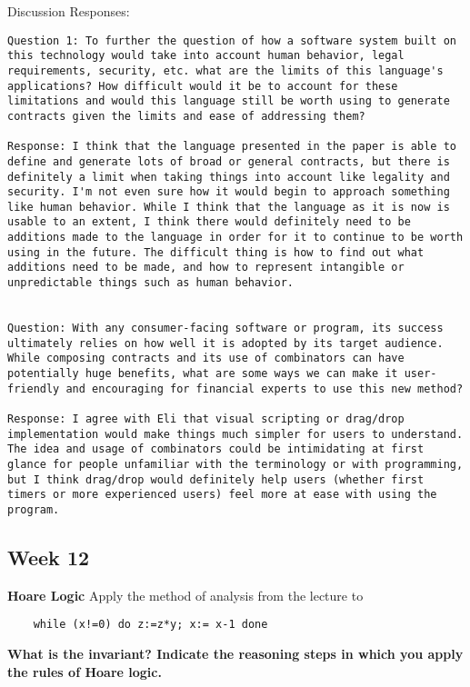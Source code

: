 \documentclass{article}
\theoremstyle{theorem}
\theoremstyle{definition}
\theoremstyle{remark}
\begin{document}
Discussion Responses:
\begin{lstlisting}
Question 1: To further the question of how a software system built on this technology would take into account human behavior, legal requirements, security, etc. what are the limits of this language's applications? How difficult would it be to account for these limitations and would this language still be worth using to generate contracts given the limits and ease of addressing them?

Response: I think that the language presented in the paper is able to define and generate lots of broad or general contracts, but there is definitely a limit when taking things into account like legality and security. I'm not even sure how it would begin to approach something like human behavior. While I think that the language as it is now is usable to an extent, I think there would definitely need to be additions made to the language in order for it to continue to be worth using in the future. The difficult thing is how to find out what additions need to be made, and how to represent intangible or unpredictable things such as human behavior.


Question: With any consumer-facing software or program, its success ultimately relies on how well it is adopted by its target audience. While composing contracts and its use of combinators can have potentially huge benefits, what are some ways we can make it user-friendly and encouraging for financial experts to use this new method?

Response: I agree with Eli that visual scripting or drag/drop implementation would make things much simpler for users to understand. The idea and usage of combinators could be intimidating at first glance for people unfamiliar with the terminology or with programming, but I think drag/drop would definitely help users (whether first timers or more experienced users) feel more at ease with using the program.
\end{lstlisting}

\subsection{Week 12}
\textbf{Hoare Logic}
\newline Apply the method of analysis from the lecture to
\begin{lstlisting}
    while (x!=0) do z:=z*y; x:= x-1 done
\end{lstlisting}

\noindent\textbf{What is the invariant? Indicate the reasoning steps in which you apply the rules of Hoare logic.}\newline
\end{document}
